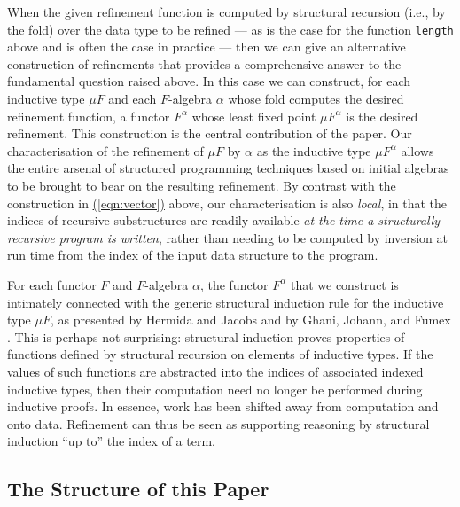 \documentclass{LMCS}
\newcommand{\parenref}[1]{\hyperref[#1]{(\ref*{#1})}}
\begin{document}
When the given refinement function is computed by structural recursion
(i.e., by the fold) over the data type to be refined --- as is the
case for the function \verb|length| above and is often the case in
practice --- then we can give an alternative construction of
refinements that provides a comprehensive answer to the fundamental
question raised above.  In this case we can construct, for each
inductive type $\mu F$ and each $F$-algebra $\alpha$ whose fold
computes the desired refinement function, a functor $F^\alpha$ whose
least fixed point $\mu F^\alpha$ is the desired refinement. This
construction is the central contribution of the paper.  Our
characterisation of the refinement of $\mu F$ by $\alpha$ as the
inductive type $\mu F^\alpha$ allows the entire arsenal of structured
programming techniques based on initial algebras to be brought to bear
on the resulting refinement. By contrast with the construction
in \parenref{eqn:vector} above, our characterisation is also {\em
  local}, in that the indices of recursive substructures are readily
available {\em at the time a structurally recursive program is
  written}, rather than needing to be computed by inversion at run
time from the index of the input data structure to the program.

For each functor $F$ and $F$-algebra $\alpha$, the functor
$F^{\alpha}$ that we construct is intimately connected with the
generic structural induction rule for the inductive type $\mu F$, as
presented by Hermida and Jacobs \cite{hermida98structural} and by
Ghani, Johann, and Fumex \cite{ghani10induction}. This is perhaps not
surprising: structural induction proves properties of functions
defined by structural recursion on elements of inductive types. If the
values of such functions are abstracted into the indices of associated
indexed inductive types, then their computation need no longer be
performed during inductive proofs. In essence, work has been shifted
away from computation and onto data. Refinement can thus be seen as
supporting reasoning by structural induction ``up to'' the index of a
term.

\subsection{The Structure of this Paper}
\end{document}
